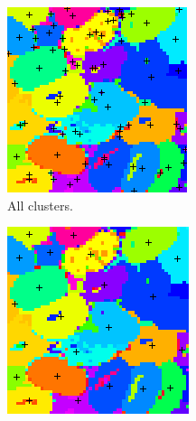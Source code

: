 \documentclass[12pt]{article}
\begin{document}
\begin{figure}
    \centering
  \begin{subfigure}[b]{0.3\textwidth}
      \includegraphics[width=\textwidth]{fig/ms_manyclusters}
      \caption{All clusters.}
  \end{subfigure}
   \begin{subfigure}[b]{0.3\textwidth}
      \includegraphics[width=\textwidth]{fig/ms_someclusters}

\end{subfigure}
\end{figure}
\end{document}
